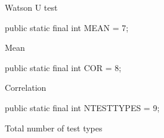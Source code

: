 \begin{tabb}   Watson U test   \end{tabb}
\begin{code}

   public static final int MEAN = 7;
\end{code}
\begin{tabb}   Mean  \end{tabb}
\begin{code}

   public static final int COR = 8;
\end{code}
\begin{tabb}   Correlation  \end{tabb}
\begin{code}

   public static final int NTESTTYPES = 9;
\end{code}
\begin{tabb}   Total number of test types  \end{tabb}

